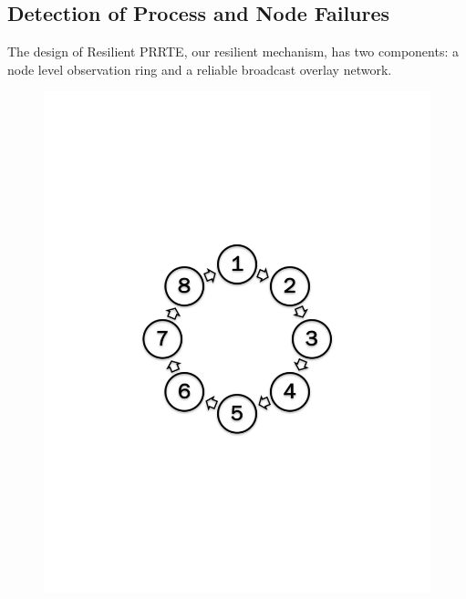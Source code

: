 \documentclass[sigconf]{acmart}
\newcommand{\prrte}[0]{\textsc{PRRTE}\xspace}
\begin{document}
\subsection{Detection of Process and Node Failures}

The design of Resilient \prrte, our resilient mechanism, has two components: a node level observation ring and a reliable broadcast overlay network.

\begin{figure}
\centering
\begin{minipage}{.23\textwidth}
  \centering
  \includegraphics[trim=3cm 8.0cm 3cm 8cm,width=\linewidth]{ring_detector.pdf}
  \label{fig:Ring}
\end{minipage}%
\begin{minipage}{.23\textwidth}
  \centering

\end{minipage}
\end{figure}
\end{document}
